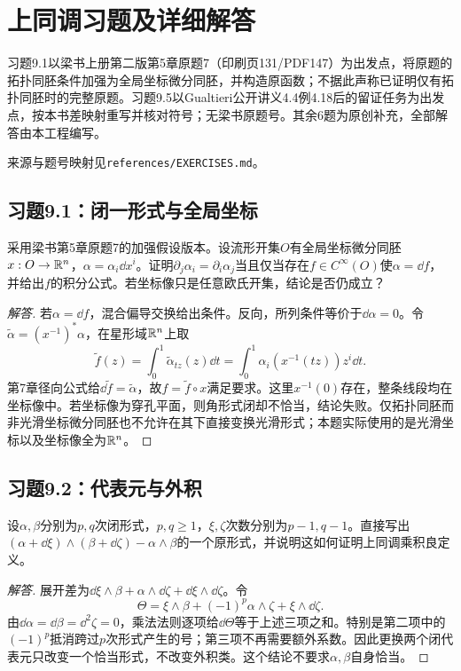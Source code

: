 \section{上同调习题及详细解答}
习题9.1以梁书上册第二版第5章原题7（印刷页131/PDF147）为出发点，将原题的拓扑同胚条件加强为全局坐标微分同胚，并构造原函数；不据此声称已证明仅有拓扑同胚时的完整原题。习题9.5以Gualtieri公开讲义4.4例4.18后的留证任务为出发点，按本书差映射重写并核对符号；无梁书原题号。其余6题为原创补充，全部解答由本工程编写。

来源与题号映射见\texttt{references/EXERCISES.md}。

\subsection*{习题9.1：闭一形式与全局坐标}
采用梁书第5章原题7的加强假设版本。设流形开集$O$有全局坐标微分同胚$x:O\to\mathbb{R}^n$，$\alpha=\alpha_i\dd x^i$。证明$\partial_j\alpha_i=\partial_i\alpha_j$当且仅当存在$f\in C^\infty(O)$使$\alpha=\dd f$，并给出$f$的积分公式。若坐标像只是任意欧氏开集，结论是否仍成立？
\begin{proof}[解答]
若$\alpha=\dd f$，混合偏导交换给出条件。反向，所列条件等价于$\dd\alpha=0$。令$\widetilde\alpha=(x^{-1})^*\alpha$，在星形域$\mathbb{R}^n$上取
\[
 \widetilde f(z)=\int_0^1\widetilde\alpha_{tz}(z)\dd t
 =\int_0^1\alpha_i(x^{-1}(tz))z^i\dd t.
\]
第7章径向公式给$\dd\widetilde f=\widetilde\alpha$，故$f=\widetilde f\circ x$满足要求。这里$x^{-1}(0)$存在，整条线段均在坐标像中。若坐标像为穿孔平面，则角形式闭却不恰当，结论失败。仅拓扑同胚而非光滑坐标微分同胚也不允许在其下直接变换光滑形式；本题实际使用的是光滑坐标以及坐标像全为$\mathbb{R}^n$。
\end{proof}

\subsection*{习题9.2：代表元与外积}
设$\alpha,\beta$分别为$p,q$次闭形式，$p,q\geq1$，$\xi,\zeta$次数分别为$p-1,q-1$。直接写出$(\alpha+\dd\xi)\wedge(\beta+\dd\zeta)-\alpha\wedge\beta$的一个原形式，并说明这如何证明上同调乘积良定义。
\begin{proof}[解答]
展开差为$\dd\xi\wedge\beta+\alpha\wedge\dd\zeta+\dd\xi\wedge\dd\zeta$。令
\[
 \Theta=\xi\wedge\beta+(-1)^p\alpha\wedge\zeta+\xi\wedge\dd\zeta.
\]
由$\dd\alpha=\dd\beta=\dd^2\zeta=0$，乘法法则逐项给$\dd\Theta$等于上述三项之和。特别是第二项中的$(-1)^p$抵消跨过$p$次形式产生的号；第三项不再需要额外系数。因此更换两个闭代表元只改变一个恰当形式，不改变外积类。这个结论不要求$\alpha,\beta$自身恰当。
\end{proof}

